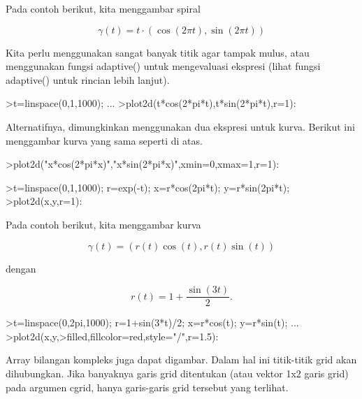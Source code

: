 \documentclass[a4paper,10pt]{article}
\begin{document}
\begin{eulernotebook}
\begin{eulercomment}
\begin{eulercomment}
\begin{eulercomment}
\begin{eulercomment}
\begin{eulercomment}
\begin{eulercomment}
\begin{eulercomment}
Pada contoh berikut, kita menggambar spiral

\end{eulercomment}
\begin{eulerformula}
\[
\gamma(t) = t \cdot (\cos(2\pi t),\sin(2\pi t))
\]
\end{eulerformula}
\begin{eulercomment}
Kita perlu menggunakan sangat banyak titik agar tampak mulus, atau menggunakan fungsi
adaptive() untuk mengevaluasi ekspresi (lihat fungsi adaptive() untuk rincian lebih
lanjut).
\end{eulercomment}
\begin{eulerprompt}
>t=linspace(0,1,1000); ...
>plot2d(t*cos(2*pi*t),t*sin(2*pi*t),r=1):
\end{eulerprompt}
\begin{eulercomment}
Alternatifnya, dimungkinkan menggunakan dua ekspresi untuk kurva. Berikut ini
menggambar kurva yang sama seperti di atas.
\end{eulercomment}
\begin{eulerprompt}
>plot2d("x*cos(2*pi*x)","x*sin(2*pi*x)",xmin=0,xmax=1,r=1):
\end{eulerprompt}
\begin{eulerprompt}
>t=linspace(0,1,1000); r=exp(-t); x=r*cos(2pi*t); y=r*sin(2pi*t);
>plot2d(x,y,r=1):
\end{eulerprompt}
\begin{eulercomment}
Pada contoh berikut, kita menggambar kurva

\end{eulercomment}
\begin{eulerformula}
\[
\gamma(t) = (r(t) \cos(t), r(t) \sin(t))
\]
\end{eulerformula}
\begin{eulercomment}
dengan

\end{eulercomment}
\begin{eulerformula}
\[
r(t) = 1 + \dfrac{\sin(3t)}{2}.
\]
\end{eulerformula}
\begin{eulerprompt}
>t=linspace(0,2pi,1000); r=1+sin(3*t)/2; x=r*cos(t); y=r*sin(t); ...
>plot2d(x,y,>filled,fillcolor=red,style="/",r=1.5):
\end{eulerprompt}
\begin{eulercomment}
Array bilangan kompleks juga dapat digambar. Dalam hal ini titik-titik grid akan
dihubungkan. Jika banyaknya garis grid ditentukan (atau vektor 1x2 garis grid) pada
argumen cgrid, hanya garis-garis grid tersebut yang terlihat.


\end{eulercomment}
\end{eulercomment}
\end{eulercomment}
\end{eulercomment}
\end{eulercomment}
\end{eulercomment}
\end{eulercomment}
\end{eulernotebook}
\end{document}
